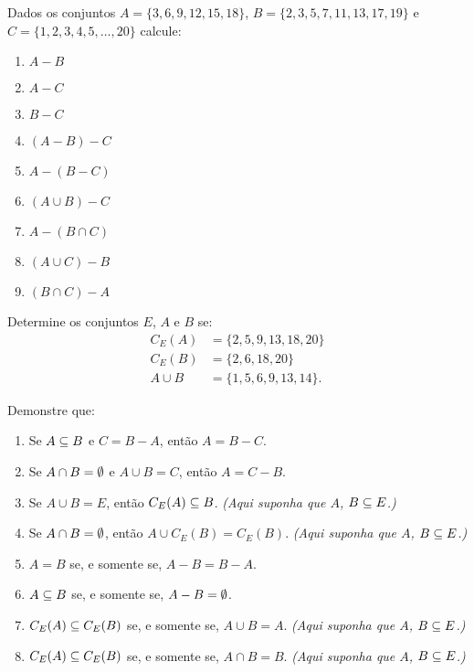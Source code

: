 \documentclass[12pt]{exam}
\begin{document}
\questao{} Dados os conjuntos $A = \{3,6,9,12,15,18\}$, $B = \{2,3,5,7,11,13,17,19\}$ e $C = \{1,2,3,4,5,\dots,20\}$ calcule:
\begin{multicols}{3}
    \begin{enumerate}[label={\alph*})]
        \item $A - B$
        \item $A - C$
        \item $B - C$
        \item $(A - B) - C$
        \item $A - (B - C)$
        \item $(A \cup B) - C$
        \item $A - (B \cap C)$
        \item $(A \cup C) - B$
        \item $(B \cap C) - A$
    \end{enumerate}
\end{multicols}

\questao{} Determine os conjuntos $E$, $A$ e $B$ se:
\begin{align*}
    C_E(A) &= \{2, 5, 9, 13, 18, 20\}\\
    C_E(B) &= \{2, 6, 18, 20\}\\
    A \cup B &= \{1, 5, 6, 9, 13, 14\}.
\end{align*}

\newpage
\questao{} Demonstre que:
\begin{enumerate}[label={\alph*})]

\item Se $A \subseteq B$ e $C = B - A$, ent\~ao $A = B - C$.

\item Se $A \cap B = \emptyset$ e $A \cup B = C$, ent\~ao $A = C - B$.

\item Se $A\cup B = E$, ent\~ao $C_E(A) \subseteq B$. \textit{(Aqui suponha que $A$, $B \subseteq E$.)}

\item Se $A \cap B = \emptyset$, ent\~ao $A \cup C_E(B) = C_E(B)$. \textit{(Aqui suponha que $A$, $B \subseteq E$.)}

\item $A = B$ se, e somente se, $A - B = B - A$.

\item $A \subseteq B$ se, e somente se, $A - B = \emptyset$.

\item $C_E(A) \subseteq C_E(B)$ se, e somente se, $A \cup B = A$. \textit{(Aqui suponha que $A$, $B \subseteq E$.)}

\item $C_E(A) \subseteq C_E(B)$ se, e somente se, $A \cap B = B$. \textit{(Aqui suponha que $A$, $B \subseteq E$.)}

\end{enumerate}
\end{document}
